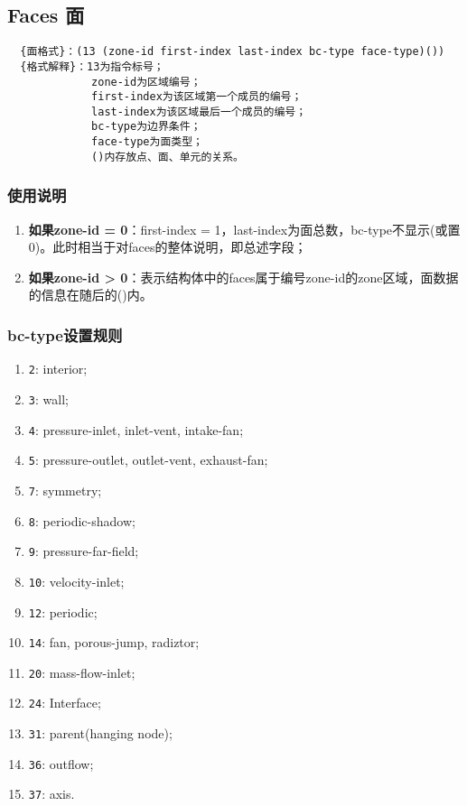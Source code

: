 \documentclass[lang=cn,11pt,a4paper]{elegantpaper}
\begin{document}
\subsection{Faces 面}\label{Faces}
\begin{lstlisting}
  {面格式}：(13 (zone-id first-index last-index bc-type face-type)())
  {格式解释}：13为指令标号；
             zone-id为区域编号；
             first-index为该区域第一个成员的编号；
             last-index为该区域最后一个成员的编号；
             bc-type为边界条件；
             face-type为面类型；
             ()内存放点、面、单元的关系。
\end{lstlisting}

\subsubsection{使用说明}
\begin{enumerate}
  \item \textbf{如果zone-id = 0}：first-index = 1，last-index为面总数，bc-type不显示(或置0)。此时相当于对faces的整体说明，即总述字段；
  \item \textbf{如果zone-id > 0}：表示结构体中的faces属于编号zone-id的zone区域，面数据的信息在随后的()内。
\end{enumerate}

\subsubsection{bc-type设置规则}\label{bc-type}
\begin{enumerate}[label=\arabic*).]
  \item \lstinline{2}: interior;
  \item \lstinline{3}: wall;
  \item \lstinline{4}: pressure-inlet, inlet-vent, intake-fan;
  \item \lstinline{5}: pressure-outlet, outlet-vent, exhaust-fan;
  \item \lstinline{7}: symmetry;
  \item \lstinline{8}: periodic-shadow;
  \item \lstinline{9}: pressure-far-field;
  \item \lstinline{10}: velocity-inlet;
  \item \lstinline{12}: periodic; 
  \item \lstinline{14}: fan, porous-jump, radiztor;
  \item \lstinline{20}: mass-flow-inlet;
  \item \lstinline{24}: Interface;
  \item \lstinline{31}: parent(hanging node);
  \item \lstinline{36}: outflow;
  \item \lstinline{37}: axis.
\end{enumerate}
\end{document}
